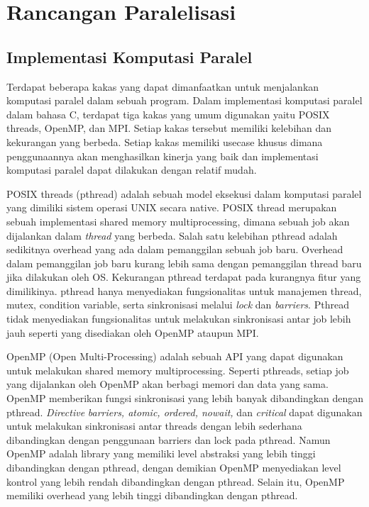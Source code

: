 \section{Rancangan Paralelisasi}
\subsection{Implementasi Komputasi Paralel} \label{sec:parallel_env}

Terdapat beberapa kakas yang dapat dimanfaatkan untuk menjalankan komputasi paralel dalam sebuah program.
Dalam implementasi komputasi paralel dalam bahasa C, terdapat tiga kakas yang umum digunakan yaitu POSIX threads, OpenMP, dan MPI. Setiap kakas tersebut memiliki kelebihan dan kekurangan yang berbeda. Setiap kakas memiliki usecase khusus dimana penggunaannya akan menghasilkan kinerja yang baik dan implementasi komputasi paralel dapat dilakukan dengan relatif mudah.

POSIX threads (pthread) adalah sebuah model eksekusi dalam komputasi paralel yang dimiliki sistem operasi UNIX secara native. POSIX thread merupakan sebuah implementasi shared memory multiprocessing, dimana sebuah job akan dijalankan dalam \textit{thread} yang berbeda. Salah satu kelebihan pthread adalah sedikitnya overhead yang ada dalam pemanggilan sebuah job baru. Overhead dalam pemanggilan job baru kurang lebih sama dengan pemanggilan thread baru jika dilakukan oleh OS. Kekurangan pthread terdapat pada kurangnya fitur yang dimilikinya. pthread hanya menyediakan fungsionalitas untuk manajemen thread, mutex, condition variable, serta sinkronisasi melalui \textit{lock} dan \textit{barriers}. Pthread tidak menyediakan fungsionalitas untuk melakukan sinkronisasi antar job lebih jauh seperti yang disediakan oleh OpenMP ataupun MPI.

OpenMP (Open Multi-Processing) adalah sebuah API yang dapat digunakan untuk melakukan shared memory multiprocessing. Seperti pthreads, setiap job yang dijalankan oleh OpenMP akan berbagi memori dan data yang sama. OpenMP memberikan fungsi sinkronisasi yang lebih banyak dibandingkan dengan pthread. \textit{Directive} \textit{barriers, atomic, ordered, nowait,} dan \textit{critical} dapat digunakan untuk melakukan sinkronisasi antar threads dengan lebih sederhana dibandingkan dengan penggunaan barriers dan lock pada pthread. Namun OpenMP adalah library yang memiliki level abstraksi yang lebih tinggi dibandingkan dengan pthread, dengan demikian OpenMP menyediakan level kontrol yang lebih rendah dibandingkan dengan pthread. Selain itu, OpenMP memiliki overhead yang lebih tinggi dibandingkan dengan pthread.

